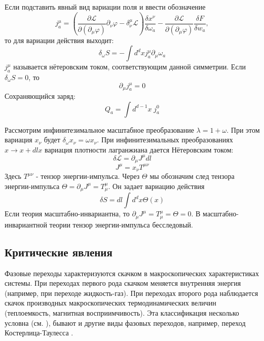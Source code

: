 \documentclass[a4paper,12pt]{article}
\theoremstyle{definition}
\theoremstyle{definition}
\theoremstyle{definition}
\begin{document}
Если подставить явный вид вариации поля и ввести обозначение
\begin{equation*}
  j^{\mu}_{a}=\left(\frac{\partial \mathcal{L}}{\partial(\partial_{\mu}\varphi)}\partial_{\nu}\varphi -\delta^{\mu}_{\nu}\mathcal{L}\right) \frac{\delta x^{\nu}}{\delta \omega_{a}}-\frac{\partial \mathcal{L}}{\partial(\partial_{\mu}\varphi)}\frac{\delta F}{\delta w_{a}},
\end{equation*}
то для вариации действия выходит:
\begin{equation*}
  \delta_{\omega}S=-\int d^{d}x j^{\mu}_{a}\partial_{\mu}\omega_{a}
\end{equation*}
$j^{\mu}_{a}$ называется нётеровским током, соответствующим данной симметрии. 
Если $\delta_{\omega} S=0$, то
\begin{equation*}
  \partial_{\mu}j^{\mu}_{a}=0
\end{equation*}
Сохраняющийся заряд:
\begin{equation*}
  Q_{a}=\int d^{d-1}x\; j^{0}_{a}
\end{equation*}

 Рассмотрим инфинитезимальное масштабное преобразование $\lambda=1+\omega$. При этом вариация
 $x_{\nu}$ будет $\delta_{\omega}x_{\nu}=\omega x_{\nu}$.  При инфинитезимальных преобразованиях
 $x\to x+dl x$ вариация плотности лагранжиана дается Нётеровским током: 
\begin{equation}
  \label{eq:74}
  \delta\mathcal{L}=\partial_{\mu}J^{\mu}dl
\end{equation}
\begin{equation}
  \label{eq:75}
  J^{\mu}=x_{\nu}T^{\mu\nu}
\end{equation}
Здесь $T^{\mu\nu}$ - тензор энергии-импульса.  Через $\Theta$ мы обозначим след тензора
энергии-импульса $\Theta=\partial_{\mu}J^{\mu}=T_{\mu}^{\mu}$. Он задает вариацию действия 
\begin{equation}
  \label{eq:87}
  \delta S=dl \int d^d x \Theta(x)
\end{equation}
Если теория масштабно-инвариантна, то $\partial_{\mu}J^{\mu}=T_{\mu}^{\mu}=\Theta=0$. В
масштабно-инвариантной теории тензор энергии-импульса бесследовый. 

\subsection{Критические явления}
\label{sec:critical-phenomena}

Фазовые переходы характеризуются скачком в макроскопических характеристиках системы. При переходах
первого рода скачком меняется внутренняя энергия (например, при переходе жидкость-газ). При
переходах второго рода наблюдается скачок производных макроскопических термодинамических величин
(теплоемкость, магнитная восприимчивость).  Эта классификация несколько условна (см.
\cite{ma2000modern,ma1980}), бывают и другие виды фазовых переходов, например, переход
Костерлица-Таулесса \cite{0022-3719-6-7-010}.  
\end{document}
